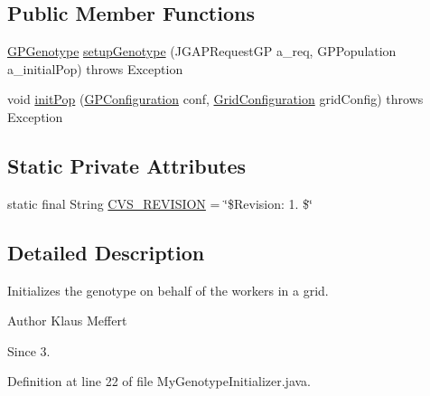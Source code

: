 \subsection*{Public Member Functions}
\begin{DoxyCompactItemize}
\item 
\hyperlink{classorg_1_1jgap_1_1gp_1_1impl_1_1_g_p_genotype}{G\-P\-Genotype} \hyperlink{classexamples_1_1grid_1_1math_problem_distributed_1_1_my_genotype_initializer_a924862d41b8381398ea21e23bad8cb86}{setup\-Genotype} (J\-G\-A\-P\-Request\-G\-P a\-\_\-req, G\-P\-Population a\-\_\-initial\-Pop)  throws Exception 
\item 
void \hyperlink{classexamples_1_1grid_1_1math_problem_distributed_1_1_my_genotype_initializer_a79289220eda5d4ea989a2f74a0224561}{init\-Pop} (\hyperlink{classorg_1_1jgap_1_1gp_1_1impl_1_1_g_p_configuration}{G\-P\-Configuration} conf, \hyperlink{classexamples_1_1grid_1_1math_problem_distributed_1_1_grid_configuration}{Grid\-Configuration} grid\-Config)  throws Exception 
\end{DoxyCompactItemize}
\subsection*{Static Private Attributes}
\begin{DoxyCompactItemize}
\item 
static final String \hyperlink{classexamples_1_1grid_1_1math_problem_distributed_1_1_my_genotype_initializer_a09e36428050856032366e6b1efb2402d}{C\-V\-S\-\_\-\-R\-E\-V\-I\-S\-I\-O\-N} = \char`\"{}\$Revision\-: 1. \$\char`\"{}
\end{DoxyCompactItemize}


\subsection{Detailed Description}
Initializes the genotype on behalf of the workers in a grid.

\begin{DoxyAuthor}{Author}
Klaus Meffert 
\end{DoxyAuthor}
\begin{DoxySince}{Since}
3. 
\end{DoxySince}


Definition at line 22 of file My\-Genotype\-Initializer.\-java.



